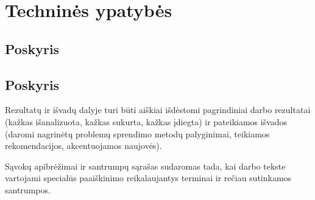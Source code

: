 \documentclass{VUMIFPSkursinis}
\begin{document}


\section{Techninės ypatybės}
\subsection{Poskyris}
\subsection{Poskyris}

Rezultatų ir išvadų dalyje turi būti aiškiai išdėstomi pagrindiniai darbo
rezultatai (kažkas išanalizuota, kažkas sukurta, kažkas įdiegta) ir pateikiamos
išvados (daromi nagrinėtų problemų sprendimo metodų palyginimai, teikiamos
rekomendacijos, akcentuojamos naujovės).


\printbibliography[heading=bibintoc, title=Šaltiniai]  %

Sąvokų apibrėžimai ir santrumpų sąrašas sudaromas tada, kai darbo tekste
vartojami specialūs paaiškinimo reikalaujantys terminai ir rečiau sutinkamos
santrumpos.

\appendix  %
\end{document}
